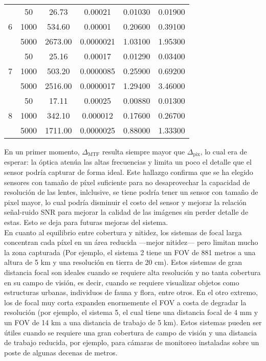 \begin{table}[h]
\begin{tabular}{|c|c|c|c|c|c|}
        \multirow{3}{*}{6}
         & 50   & 26.73  & 0.00021   & 0.01030  & 0.01900   \\ 
         & 1000 & 534.60 & 0.00001   & 0.20600  & 0.39100   \\ 
         & 5000 & 2673.00& 0.0000021   & 1.03100  & 1.95300   \\ 
        \hline
        
        \multirow{3}{*}{7}
         & 50   & 25.16  & 0.00017   & 0.01290  & 0.03400   \\ 
         & 1000 & 503.20 & 0.0000085   & 0.25900  & 0.69200   \\ 
         & 5000 & 2516.00& 0.0000017   & 1.29400  & 3.46000   \\ 
        \hline
        
        \multirow{3}{*}{8}
         & 50   & 17.11  & 0.00025   & 0.00880  & 0.01300   \\ 
         & 1000 & 342.10 & 0.000012   & 0.17600  & 0.26700   \\ 
         & 5000 & 1711.00& 0.0000025   & 0.88000  & 1.33300   \\ 
        \hline
    \end{tabular}
\end{table}




\noindent En un primer momento, \(\Delta_{\mathrm{MTF}}\) resulta siempre mayor que \(\Delta_{\mathrm{pix}}\), lo cual era de esperar: la óptica atenúa las altas frecuencias y limita un poco el detalle que el sensor podría capturar de forma ideal. Este hallazgo confirma que se ha elegido sensores con tamaño de píxel suficiente para no desaprovechar la capacidad de resolución de las lentes, inlclusive, se tiene podría tener un sensor con tamaño de pixel mayor, lo cual podría disminuir el costo del sensor y mejorar la relación señal-ruido SNR para mejorar la calidad de las imágenes sin perder detalle de estas. Esto se deja para futuras mejoras del sistema.\\

\noindent En cuanto al equilibrio entre cobertura y nitidez, los sistemas de focal larga concentran cada píxel en un área reducida —mejor nitidez— pero limitan mucho la zona capturada (Por ejemplo, el sistema 2 tiene un FOV de 881 metros a una altura de 5 km y una resolución en tierra de 20 cm). Estos sistemas de gran distancia focal son ideales cuando se requiere alta resolución y no tanta cobertura en su campo de visión, es decir, cuando se requiere visualizar objetos como estructuras urbanas, individuos de fauna y flora, entre otros. En el otro extremo, los de focal muy corta expanden enormemente el FOV a costa de degradar la resolución (por ejemplo, el sistema 5, el cual tiene una distancia focal de 4 mm y un FOV de 14 km a una distancia de trabajo de 5 km). Estos sistemas pueden ser útiles cuando se requiere una gran cobertura de campo de visión y una distancia de trabajo reducida, por ejemplo, para cámaras de monitoreo instaladas sobre un poste de algunas decenas de metros. 


